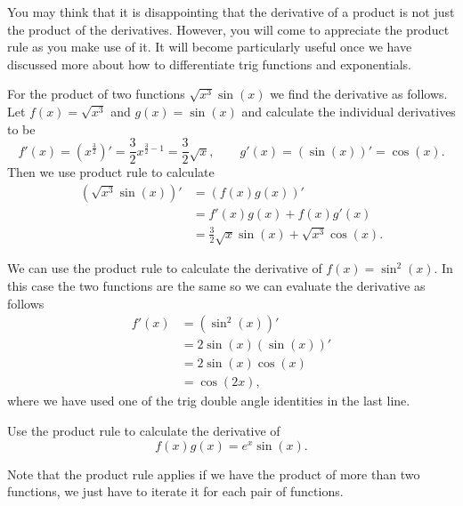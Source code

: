 You may think that it is disappointing that the derivative of a product is not just the product of the derivatives. However, you will come to appreciate the product rule as you make use of it. It will become particularly useful once we have discussed more about how to differentiate trig functions and exponentials. 

\begin{ex}
For the product of two functions $\sqrt{x^{3}}\sin(x)$ we find the derivative as follows. Let $f(x)=\sqrt{x^{3}}$ and $g(x)=\sin(x)$ and calculate the individual derivatives to be
\begin{equation*}
f'(x)=(x^{\frac{3}{2}})'=\frac{3}{2}x^{\frac{3}{2}-1}=\frac{3}{2}\sqrt{x}, \qquad g'(x)=(\sin(x))'=\cos(x).
\end{equation*}
Then we use product rule to calculate
\begin{align*}
\left(\sqrt{x^{3}}\sin(x)\right)'	&=\left(f(x)g(x)\right)'\\
					&=f'(x)g(x)+f(x)g'(x)\\
					&=\frac{3}{2}\sqrt{x}\sin(x)+\sqrt{x^{3}}\cos(x).
\end{align*}
\end{ex}

\begin{ex}
We can use the product rule to calculate the derivative of $f(x)=\sin^{2}(x)$. In this case the two functions are the same so we can evaluate the derivative as follows
\begin{align*}
f'(x)	&=\left(\sin^{2}(x)\right)'\\
	&=2\sin(x)\left(\sin(x)\right)'\\
	&=2\sin(x)\cos(x)\\
	&=\cos(2x),
\end{align*}
where we have used one of the trig double angle identities in the last line.
\end{ex}

\begin{exercise}
Use the product rule to calculate the derivative of 
\begin{equation*}
f(x)g(x)=e^{x}\sin(x).
\end{equation*}
\end{exercise}

Note that the product rule applies if we have the product of more than two functions, we just have to iterate it for each pair of functions.

